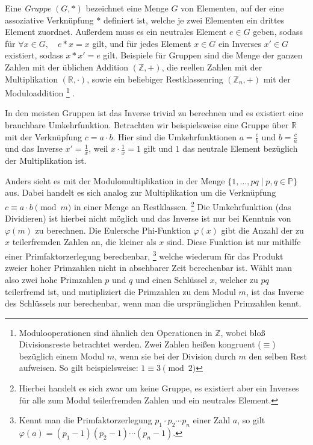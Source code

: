 Eine \emph{Gruppe} $(G,*)$ bezeichnet eine Menge $G$ von Elementen, auf der eine assoziative Verknüpfung $*$ definiert ist, welche je zwei Elementen ein drittes Element zuordnet.
Außerdem muss es ein neutrales Element $e \in G$ geben, sodass für $\forall x \in G, \quad e*x=x$ gilt, und für jedes Element $x \in G$ ein Inverses $x' \in G$ existiert, sodass $x*x'=e$ gilt.
Beispiele für Gruppen sind die Menge der ganzen Zahlen mit der üblichen Addition $(\mathbb{Z}, +)$, die reellen Zahlen mit der Multiplikation $(\mathbb{R}, \cdot)$, sowie ein beliebiger Restklassenring $(\mathbb{Z}_n, +)$ mit der Moduloaddition%
\footnote{Modulooperationen sind ähnlich den Operationen in $\mathbb{Z}$, wobei bloß Divisionsreste betrachtet werden.
Zwei Zahlen heißen kongruent ($\equiv$) bezüglich einem Modul $m$, wenn sie bei der Division durch $m$ den selben Rest aufweisen.
So gilt beispielsweise: $1 \equiv 3 \pmod{2}$}%
.

In den meisten Gruppen ist das Inverse trivial zu berechnen und es existiert eine brauchbare Umkehrfunktion.
Betrachten wir beispielsweise eine Gruppe über $\mathbb{R}$ mit der Verknüpfung $c = a \cdot b$.
Hier sind die Umkehrfunktionen $a = \frac{c}{b}$ und $b = \frac{c}{a}$ und das Inverse $x'=\frac{1}{x}$, weil $x \cdot \frac{1}{x} = 1$ gilt und $1$ das neutrale Element bezüglich der Multiplikation ist.

Anders sieht es mit der Modulomultiplikation in der Menge $\{ 1, \dotsc, pq \mid p,q \in \mathbb{P}\}$ aus.
Dabei handelt es sich analog zur Multiplikation um die Verknüpfung $c \equiv a \cdot b \pmod{m}$ in einer Menge an Restklassen.%
\footnote{Hierbei handelt es sich zwar um keine Gruppe, es existiert aber ein Inverses für alle zum Modul teilerfremden Zahlen und ein neutrales Element. }
Die Umkehrfunktion (das Dividieren) ist hierbei nicht möglich und das Inverse ist nur bei Kenntnis von $\varphi(m)$ zu berechnen.
Die Eulersche Phi-Funktion $\varphi(x)$ gibt die Anzahl der zu $x$ teilerfremden Zahlen an, die kleiner als $x$ sind.
Diese Funktion ist nur mithilfe einer Primfaktorzerlegung berechenbar,%
\footnote{Kennt man die Primfaktorzerlegung $p_1 \cdot p_2 \dotsm p_n$ einer Zahl $a$, so gilt $\varphi (a) = (p_1-1) (p_2-1) \dotsm (p_n-1)$.}
welche wiederum für das Produkt zweier hoher Primzahlen nicht in absehbarer Zeit berechenbar ist.
Wählt man also zwei hohe Primzahlen $p$ und $q$ und einen Schlüssel $x$, welcher zu $pq$ teilerfremd ist, und mutipliziert die Primzahlen zu dem Modul $m$, ist das Inverse des Schlüssels nur berechenbar, wenn man die ursprünglichen Primzahlen kennt.

